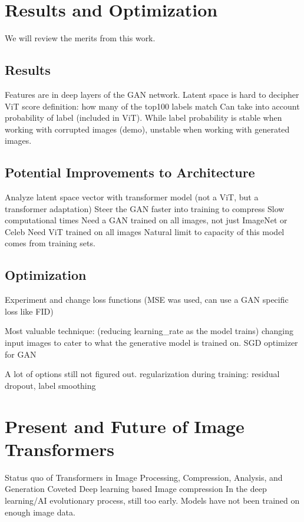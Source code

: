 \section{Results and Optimization}
We will review the merits from this work.

\subsection{Results}

Features are in deep layers of the GAN network. 
Latent space is hard to decipher
ViT score definition: how many of the top100 labels match
Can take into account probability of label (included in ViT).
While label probability is stable when working with corrupted images (demo), 
unstable when working with generated images.

\subsection{Potential Improvements to Architecture}

Analyze latent space vector with transformer model (not a ViT, but a transformer adaptation)
Steer the GAN faster into training to compress
Slow computational times
Need a GAN trained on all images, not just ImageNet or Celeb 
Need ViT trained on all images
Natural limit to capacity of this model comes from training sets.

\subsection{Optimization}

Experiment and change loss functions (MSE was used, can use a GAN specific loss like FID)

Most valuable technique:
(reducing learning\_rate as the model trains)
changing input images to cater to what the generative model is trained on.
SGD optimizer for GAN

A lot of options still not figured out.
regularization during training: residual dropout, label smoothing

\newpage
\section{Present and Future of Image Transformers}
Status quo of Transformers in Image Processing, Compression, Analysis, and Generation
Coveted Deep learning based Image compression 
In the deep learning/AI evolutionary process, still too early. Models have not been trained on enough image data.

